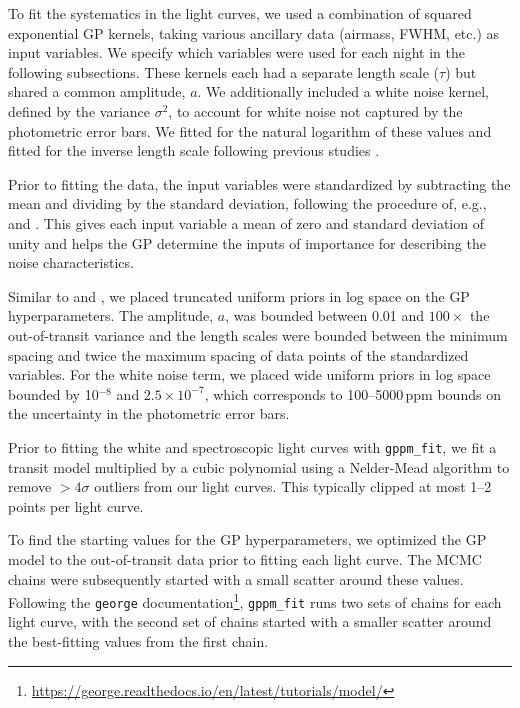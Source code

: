 \documentclass[twocolumn]{aastex63}
\newcommand{\gppmfit}{\texttt{gppm\_fit}}
\begin{document}
To fit the systematics in the light curves, we used a combination of squared exponential GP kernels, taking various ancillary data (airmass, FWHM, etc.) as input variables. We specify which variables were used for each night in the following subsections.  These kernels each had a separate length scale ($\tau$) but shared a common amplitude, $a$. We additionally included a white noise kernel, defined by the variance $\sigma^2$, to account for white noise not captured by the photometric error bars. We fitted for the natural logarithm of these values and fitted for the inverse length scale following previous studies \cite[e.g.,][]{Gibson2012,Gibson2017,Evans2017,Evans2018,Kirk2019,Alderson2020}.

Prior to fitting the data, the input variables were standardized by subtracting the mean and dividing by the standard deviation, following the procedure of, e.g., \cite{Evans2017,Evans2018,Kirk2019} and \cite{Alderson2020}. This gives each input variable a mean of zero and standard deviation of unity and helps the GP determine the inputs of importance for describing the noise characteristics. 

Similar to \cite{Gibson2017} and \cite{Alderson2020}, we placed truncated uniform priors in log space on the GP hyperparameters. The amplitude, $a$, was bounded between 0.01 and $100 \times$ the out-of-transit variance and the length scales were bounded between the minimum spacing and twice the maximum spacing of data points of the standardized variables. For the white noise term, we placed wide uniform priors in log space bounded by 10$^{-8}$ and $2.5 \times 10^{-7}$, which corresponds to 100--5000\,ppm bounds on the uncertainty in the photometric error bars. 

Prior to fitting the white and spectroscopic light curves with \gppmfit{}, we fit a transit model multiplied by a cubic polynomial using a Nelder-Mead algorithm \citep{nelder1965} to remove $>4 \sigma$ outliers from our light curves. This typically clipped at most 1--2 points per light curve.

To find the starting values for the GP hyperparameters, we optimized the GP model to the out-of-transit data prior to fitting each light curve. The MCMC chains were subsequently started with a small scatter around these values. Following the \texttt{george} documentation\footnote{\url{https://george.readthedocs.io/en/latest/tutorials/model/}}, \gppmfit{} runs two sets of chains for each light curve, with the second set of chains started with a smaller scatter around the best-fitting values from the first chain. 
\end{document}
